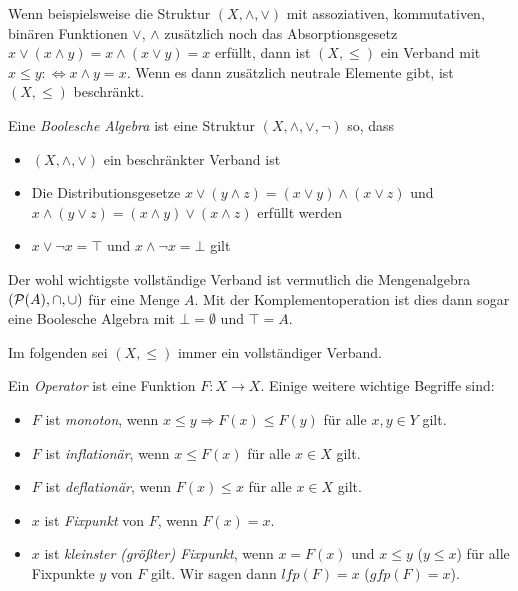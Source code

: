 Wenn beispielsweise die Struktur $(X,\land,\lor)$ mit assoziativen, kommutativen, binären Funktionen $\lor$, $\land$ zusätzlich noch das Absorptionsgesetz $x\lor(x\land y) = x\land (x \lor y) = x$ erfüllt, dann ist $(X,\leq)$ ein Verband mit $x\leq y :\Leftrightarrow x\land y = x$. Wenn es dann zusätzlich neutrale Elemente gibt, ist $(X,\leq)$ beschränkt.

\begin{definition}
	Eine \textit{Boolesche Algebra} ist eine Struktur $(X,\land,\lor,\neg)$ so, dass
	\begin{itemize}
		\item $(X,\land, \lor)$ ein beschränkter Verband ist
		\item Die Distributionsgesetze $x\lor( y\land z)= (x\lor y) \land (x\lor z)$ und $x \land (y\lor z) = (x\land y) \lor (x\land z)$ erfüllt werden
		\item $x\lor \neg x=\top$ und $x\land \neg x=\bot$ gilt
	\end{itemize}
\end{definition}

Der wohl wichtigste vollständige Verband ist vermutlich die Mengenalgebra $(\mathcal{P}(A),\cap,\cup)$ für eine Menge $A$. Mit der Komplementoperation ist dies dann sogar eine Boolesche Algebra mit $\bot=\emptyset$ und $\top=A$.

Im folgenden sei $(X,\leq)$ immer ein vollständiger Verband.

\begin{definition}[Operatoren]
	Ein \textit{Operator} ist eine Funktion $F:X\to X$.
	Einige weitere wichtige Begriffe sind:
	\begin{itemize}
		\item $F$ ist \textit{monoton}, wenn $x\leq y \Rightarrow F(x)\leq F(y)$ für alle $x,y\in Y$ gilt.
		\item $F$ ist \textit{inflationär}, wenn $x\leq F(x)$ für alle $x\in X$ gilt.
		\item $F$ ist \textit{deflationär}, wenn $F(x)\leq x$ für alle $x\in X$ gilt.
		\item $x$ ist \textit{Fixpunkt} von $F$, wenn $F(x)=x$.
		\item $x$ ist \textit{kleinster (größter) Fixpunkt}, wenn $x=F(x)$ und $x\leq y$ ($y\leq x$) für alle Fixpunkte $y$ von $F$ gilt. Wir sagen dann $lfp(F)=x$ ($gfp(F)=x$).
	\end{itemize}
\end{definition}

